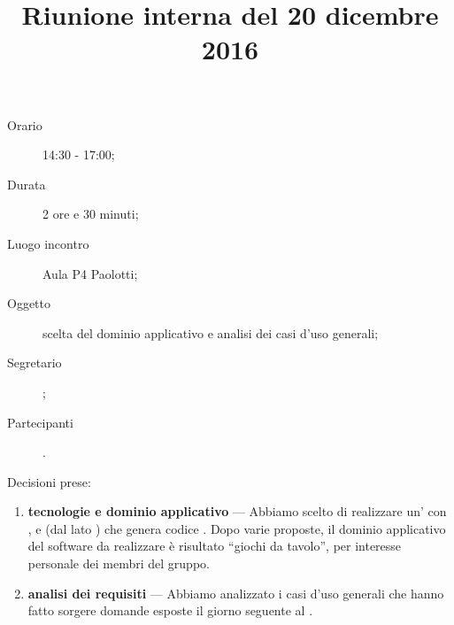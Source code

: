 


\author{\PB}
\supervisor{\MM}
\dest{\ALL}
\title{Riunione interna del 20 dicembre 2016}



\maketitle

\begin{description}
	\item[Orario] 14:30 - 17:00;
	\item[Durata] 2 ore e 30 minuti;
	\item[Luogo incontro] Aula P4 Paolotti;
	\item[Oggetto] scelta del dominio applicativo e analisi dei casi d'uso generali;
	\item[Segretario] \PB;
	\item[Partecipanti] \ALL.
\end{description}

Decisioni prese:
\begin{enumerate}
	\item \textbf{tecnologie e dominio applicativo} --- Abbiamo scelto di realizzare un' con ,  e  (dal lato ) che genera codice . Dopo varie proposte, il dominio applicativo del software da realizzare è risultato “giochi da tavolo”, per interesse personale dei membri del gruppo.
	\item \textbf{analisi dei requisiti} --- Abbiamo analizzato i casi d'uso generali che hanno fatto sorgere domande esposte il giorno seguente al \GP.
\end{enumerate}


